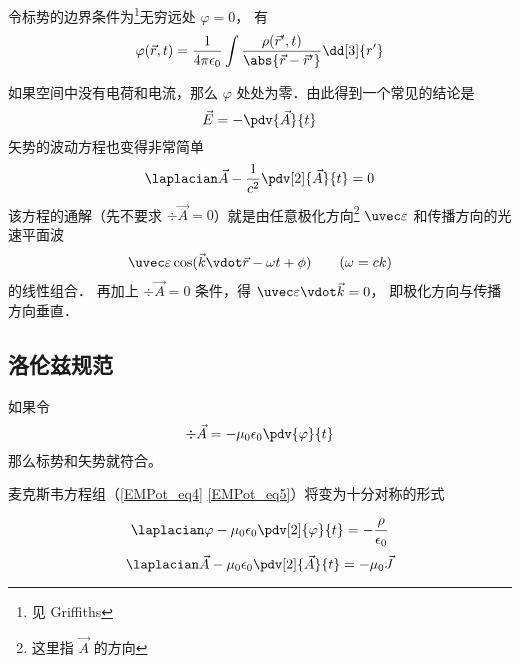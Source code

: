 令标势的边界条件为\footnote{见 Griffiths}无穷远处 $\varphi = 0$， 有
\begin{equation}
\varphi(\vec r, t) = \frac{1}{4\pi\epsilon_0} \int \frac{\rho(\vec r', t)}{\abs{\vec r - \vec r'}} \dd[3]{r'}
\end{equation}

如果空间中没有电荷和电流，那么 $\varphi$ 处处为零．由此得到一个常见的结论是
\begin{equation}
\vec E = - \pdv{\vec A}{t}
\end{equation}
矢势的波动方程也变得非常简单
\begin{equation}
\laplacian \vec A - \frac{1}{c^2} \pdv[2]{\vec A}{t} = 0
\end{equation}
该方程的通解（先不要求 $\div \vec A = 0$）就是由任意极化方向\footnote{这里指 $\vec A$ 的方向} $\uvec \varepsilon$ 和传播方向的光速平面波
\begin{equation}
\uvec \varepsilon \cos(\vec k \vdot \vec r - \omega t + \phi) \qquad (\omega = ck)
\end{equation}
的线性组合． 再加上 $\div \vec A = 0$ 条件，得 $\uvec \varepsilon \vdot \vec k = 0$， 即极化方向与传播方向垂直．

\subsection{洛伦兹规范}
如果令
\begin{equation}
\div \vec A = -\mu_0 \epsilon_0 \pdv{\varphi}{t}
\end{equation}
那么标势和矢势就符合。 

麦克斯韦方程组（\autoref{EMPot_eq4} \autoref{EMPot_eq5}）将变为十分对称的形式

\begin{equation}\label{Gauge_eq14}
\laplacian \varphi - \mu_0\epsilon_0 \pdv[2]{\varphi}{t} = -\frac{\rho}{\epsilon_0}
\end{equation}
\begin{equation}\label{Gauge_eq15}
\laplacian \vec A - \mu_0\epsilon_0 \pdv[2]{\vec A}{t} = -\mu_0 \vec J
\end{equation}
